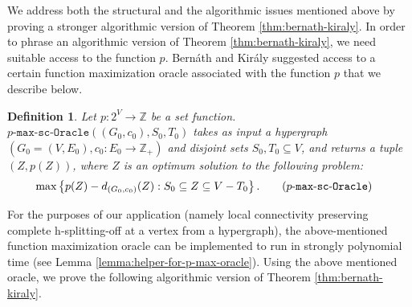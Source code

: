 \documentclass{article}
\newtheorem{definition}{Definition}[section]
\newcommand{\functionMaximizationOracleStrongCover}[1]{\ensuremath{{#1}\text{-}\mathtt{max}\text{-}\mathtt{sc}\text{-}\mathtt{Oracle}}\xspace}
\providecommand{\Z}{\mathbb{Z}}
\begin{document}
We address both the structural and the algorithmic issues mentioned above by proving a stronger algorithmic 
version of Theorem \ref{thm:bernath-kiraly}. 
In order to phrase an algorithmic version of Theorem \ref{thm:bernath-kiraly}, we need suitable access to the function $p$. Bern\'{a}th and Kir\'{a}ly \cite{Bernath-Kiraly} suggested access to a certain function maximization oracle associated with the function $p$ that we describe below. 

\begin{definition}
    Let $p: 2^V\rightarrow \Z$ be a set function.    $\functionMaximizationOracleStrongCover{p}\left(\left(G_0, c_0\right), S_0, T_0\right)$ takes as input a hypergraph $(G_0=(V, E_0), c_0: E_0\rightarrow \mathbb{Z}_{+})$ and disjoint sets $S_0, T_0\subseteq V$, and returns a tuple $(Z, p(Z))$, where $Z$ is an optimum solution to the following problem:
        \begin{align*}
        \max & \left\{p(Z)-d_{(G_0, c_0)}(Z): S_0\subseteq Z\subseteq V-T_0\right\}. \tag{\functionMaximizationOracleStrongCover{p}}\label{tag:maximization-oracle-strong-cover}
        \end{align*}
\end{definition}
For the purposes of our application (namely local connectivity preserving complete h-splitting-off at a vertex from a hypergraph), the above-mentioned function maximization oracle can be implemented to run in strongly polynomial time (see Lemma \ref{lemma:helper-for-p-max-oracle}). Using the above mentioned oracle, we prove the following algorithmic version of Theorem \ref{thm:bernath-kiraly}.
\end{document}
